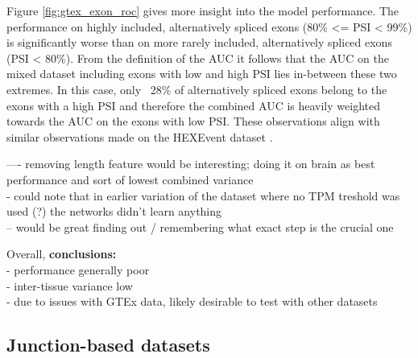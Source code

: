 Figure \ref{fig:gtex_exon_roc} gives more insight into the model performance. The performance on highly included, alternatively spliced exons (80\% <= PSI < 99\%) is significantly worse than on more rarely included, alternatively spliced exons (PSI < 80\%). From the definition of the AUC it follows that the AUC on the mixed dataset including exons with low and high PSI lies in-between these two extremes. In this case, only ~28\% of alternatively spliced exons belong to the exons with a high PSI and therefore the combined AUC is heavily weighted towards the AUC on the exons with low PSI. These observations align with similar observations made on the HEXEvent dataset \cite{dsc}.

---- removing length feature would be interesting; doing it on brain as best performance and sort of lowest combined variance\\




%

- could note that in earlier variation of the dataset where no TPM treshold was used (?) the networks didn't learn anything\\
	-- would be great finding out / remembering what exact step is the crucial one
	


Overall, 
\textbf{conclusions:}\\
	- performance generally poor\\
	- inter-tissue variance low\\
	- due to issues with GTEx data, likely desirable to test with other datasets
	
	
	

\subsection{Junction-based datasets} \label{subsec:gtex_junc}

